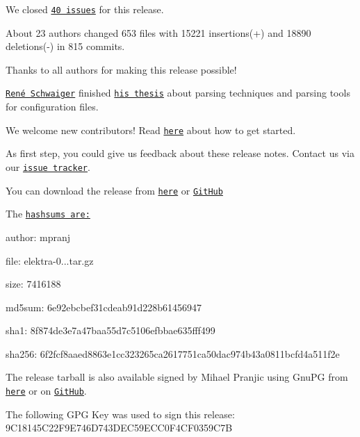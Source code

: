 We closed \href{https://github.com/ElektraInitiative/libelektra/milestone/22?closed=1}{\tt 40 issues} for this release.

About 23 authors changed 653 files with 15221 insertions(+) and 18890 deletions(-\/) in 815 commits.

Thanks to all authors for making this release possible!

\href{https://github.com/sanssecours}{\tt René Schwaiger} finished \href{https://github.com/sanssecours/Configuration-File-Parsing/releases}{\tt his thesis} about parsing techniques and parsing tools for configuration files.

We welcome new contributors! Read \href{https://www.libelektra.org/devgettingstarted/ideas}{\tt here} about how to get started.

As first step, you could give us feedback about these release notes. Contact us via our \href{https://issues.libelektra.org}{\tt issue tracker}.

You can download the release from \href{https://www.libelektra.org/ftp/elektra/releases/elektra-0.9.2.tar.gz}{\tt here} or \href{https://github.com/ElektraInitiative/ftp/blob/master/releases/elektra-0.9.2.tar.gz?raw=true}{\tt Git\+Hub}

The \href{https://github.com/ElektraInitiative/ftp/blob/master/releases/elektra-0.9.2.tar.gz.hashsum?raw=true}{\tt hashsums are\+:}


\begin{DoxyItemize}
\item author\+: mpranj
\item file\+: elektra-\/0...\+tar.\+gz
\item size\+: 7416188
\item md5sum\+: 6e92ebcbef31cdeab91d228b61456947
\item sha1\+: 8f874de3e7a47baa55d7c5106efbbae635fff499
\item sha256\+: 6f2fcf8aaed8863e1cc323265ca2617751ca50dac974b43a0811bcfd4a511f2e
\end{DoxyItemize}

The release tarball is also available signed by Mihael Pranjic using Gnu\+PG from \href{https://www.libelektra.org/ftp/elektra/releases/elektra-0.9.2.tar.gz.gpg}{\tt here} or on \href{https://github.com/ElektraInitiative/ftp/blob/master/releases/elektra-0.9.2.tar.gz.gpg?raw=true}{\tt Git\+Hub}.

The following G\+PG Key was used to sign this release\+: 9\+C18145\+C22\+F9\+E746\+D743\+D\+E\+C59\+E\+C\+C0\+F4\+C\+F0359\+C7B

